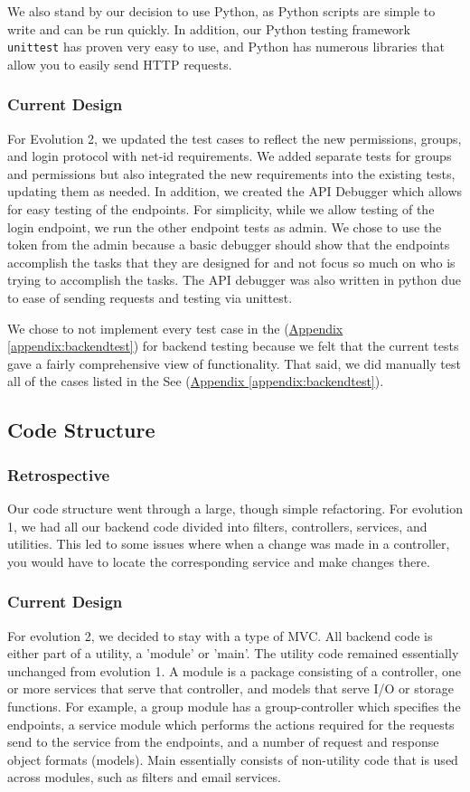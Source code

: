 \documentclass[12pt]{article}
\begin{document}
We also stand by our decision to use Python, as Python scripts are simple to write and can be run quickly. In addition, our Python testing framework  \texttt{unittest} has proven very easy to use, and Python has numerous libraries that allow you to easily send HTTP requests. 

\subsubsection{Current Design}
For Evolution 2, we updated the test cases to reflect the new permissions, groups, and login protocol with net-id requirements. We added separate tests for groups and permissions but also integrated the new requirements into the existing tests, updating them as needed. In addition, we created the API Debugger which allows for easy testing of the endpoints. For simplicity, while we allow testing of the login endpoint, we run the other endpoint tests as admin. We chose to use the token from the admin because a basic debugger should show that the endpoints accomplish the tasks that they are designed for and not focus so much on who is trying to accomplish the tasks. The API debugger was also written in python due to ease of sending requests and testing via unittest. 

We chose to not implement every test case in the (\hyperref[appendix:backendtest]{Appendix \ref{appendix:backendtest}}) for backend testing because we felt that the current tests gave a fairly comprehensive view of functionality. That said, we did manually test all of the cases listed in the See (\hyperref[appendix:backendtest]{Appendix \ref{appendix:backendtest}}).


\subsection{Code Structure}
\subsubsection{Retrospective}
Our code structure went through a large, though simple refactoring. For evolution 1, we had all our backend code divided into filters, controllers, services, and utilities. This led to some issues where when a change was made in a controller, you would have to locate the corresponding service and make changes there. 
\subsubsection{Current Design}
For evolution 2, we decided to stay with a type of MVC. All backend code is either part of a utility, a 'module' or 'main'. The utility code remained essentially unchanged from evolution 1. A module is a package consisting of a controller, one or more services that serve that controller, and models that serve I/O or storage functions. For example, a group module has a group-controller which specifies the endpoints, a service module which performs the actions required for the requests send to the service from the endpoints, and a number of request and response object formats (models). Main essentially consists of non-utility code that is used across modules, such as filters and email services. 
\end{document}
